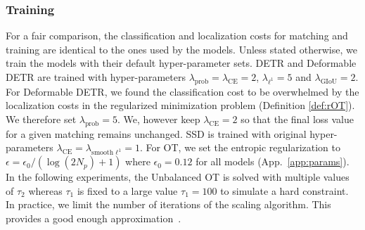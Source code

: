 \subsubsection{Training} For a fair comparison, the classification and localization costs for matching and training are identical to the ones used by the models. Unless stated otherwise, we train the models with their default hyper-parameter sets.  DETR and Deformable DETR are trained with hyper-parameters $\lambda_{\text{prob}}=\lambda_{\mathrm{CE}}=2$,  $\lambda_{\ell^1} = 5$ and $\lambda_{\mathrm{GIoU}}=2$. For Deformable DETR, we found the classification cost to be overwhelmed by the localization costs in the regularized minimization problem (Definition \ref{def:rOT}). We therefore set $\lambda_{\text{prob}} = 5$. We, however keep $\lambda_{\mathrm{CE}} = 2$ so that the final loss value for a given matching remains unchanged. SSD is trained with original hyper-parameters $\lambda_{\mathrm{CE}}=\lambda_{\text{smooth }\ell^1} =1$.
For OT, we set the entropic regularization to $\epsilon = \epsilon_0/(\log{(2N_p)} + 1)$ where $\epsilon_0=0.12$ for all models (App.~\ref{app:params}). In the following experiments, the Unbalanced OT is solved with multiple values of $\tau_2$ whereas $\tau_1$ is fixed to a large value $\tau_1=100$ to simulate a hard constraint. In practice, we limit the number of iterations of the scaling algorithm. This provides a good enough approximation~\cite{ge2021yolox}.

